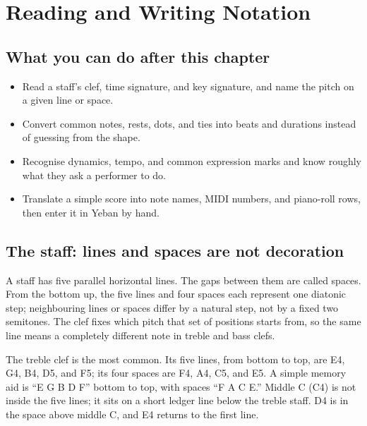 \clearpage
\chapter{Reading and Writing Notation}


\label{sec:reading-notation}

\section*{What you can do after this chapter}
\begin{itemize}
  \item Read a staff's clef, time signature, and key signature, and name the pitch on a given line or space.
  \item Convert common notes, rests, dots, and ties into beats and durations instead of guessing from the shape.
  \item Recognise dynamics, tempo, and common expression marks and know roughly what they ask a performer to do.
  \item Translate a simple score into note names, MIDI numbers, and piano-roll rows, then enter it in Yeban by hand.
\end{itemize}

\section{The staff: lines and spaces are not decoration}

A staff has five parallel horizontal lines. The gaps between them are called spaces. From the bottom up, the five lines and four spaces each represent one diatonic step; neighbouring lines or spaces differ by a natural step, not by a fixed two semitones. The clef fixes which pitch that set of positions starts from, so the same line means a completely different note in treble and bass clefs.

The treble clef is the most common. Its five lines, from bottom to top, are E4, G4, B4, D5, and F5; its four spaces are F4, A4, C5, and E5. A simple memory aid is ``E G B D F'' bottom to top, with spaces ``F A C E.'' Middle C (C4) is not inside the five lines; it sits on a short ledger line below the treble staff. D4 is in the space above middle C, and E4 returns to the first line.

